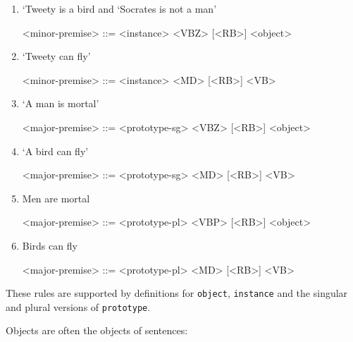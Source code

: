 \begin{enumerate}
    \item `Tweety is a bird and `Socrates is not a man'
    \begin{grammar}
        <minor-premise> ::= <instance> <VBZ> [<RB>] <object>
    \end{grammar}
    \item `Tweety can fly'
    \begin{grammar}
        <minor-premise> ::= <instance> <MD> [<RB>] <VB>
    \end{grammar}

    \item `A man is mortal'
    \begin{grammar}
        <major-premise> ::= <prototype-sg> <VBZ> [<RB>] <object>
    \end{grammar}
    \item `A bird can fly'
    \begin{grammar}
        <major-premise> ::= <prototype-sg> <MD> [<RB>] <VB>
    \end{grammar}
    \item Men are mortal
    \begin{grammar}
        <major-premise> ::= <prototype-pl> <VBP> [<RB>] <object>
    \end{grammar}
    \item Birds can fly
    \begin{grammar}
        <major-premise> ::= <prototype-pl> <MD> [<RB>] <VB>
    \end{grammar}
\end{enumerate}

These rules are supported by definitions for \texttt{object}, \texttt{instance} and the singular and plural versions of \texttt{prototype}. 

Objects are often the objects of sentences:

